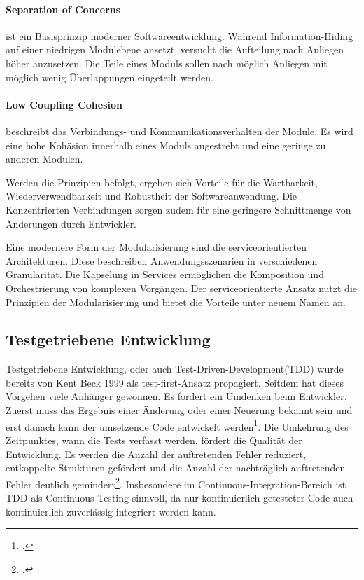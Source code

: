 \paragraph{Separation of Concerns} ist ein Basisprinzip moderner Softwareentwicklung. Während Information-Hiding auf einer niedrigen Modulebene ansetzt, versucht die \glqq Aufteilung nach Anliegen\grqq{} höher anzusetzen. Die Teile eines Moduls sollen nach möglich Anliegen  mit möglich wenig Überlappungen eingeteilt werden.
\paragraph{Low Coupling Cohesion} beschreibt das Verbindungs- und Kommunikationsverhalten der Module. Es wird eine hohe Kohäsion innerhalb eines Moduls angestrebt und eine geringe zu anderen Modulen.

Werden die Prinzipien befolgt, ergeben sich Vorteile für die Wartbarkeit, Wiederverwendbarkeit und Robustheit der Softwareanwendung. Die Konzentrierten Verbindungen sorgen zudem für eine geringere Schnittmenge von Änderungen durch Entwickler.

Eine modernere Form der Modularisierung sind die \glqq serviceorientierten Architekturen\grqq{}. Diese beschreiben Anwendungsszenarien in verschiedenen Granularität. Die Kapselung in Services ermöglichen die Komposition und Orchestrierung von komplexen Vorgängen. Der serviceorientierte Ansatz nutzt die Prinzipien der Modularisierung und bietet die Vorteile unter neuem Namen an.

\subsection{Testgetriebene Entwicklung}
\label{test-driven-development}

Testgetriebene Entwicklung, oder auch Test-Driven-Development(TDD) wurde bereits von Kent Beck 1999 als \glqq test-first\grqq{}-Ansatz propagiert. Seitdem hat dieses Vorgehen viele Anhänger gewonnen. Es fordert ein Umdenken beim Entwickler. Zuerst muss das Ergebnis einer Änderung oder einer Neuerung bekannt sein und erst danach kann der umsetzende Code entwickelt werden\footcite[vgl.][Kap. Understanding TDD]{tdd-java}. Die Umkehrung des Zeitpunktes, wann die Tests verfasst werden, fördert die Qualität der Entwicklung. Es werden die Anzahl der auftretenden Fehler reduziert, entkoppelte Strukturen gefördert und die Anzahl der nachträglich auftretenden Fehler deutlich gemindert\footcite[vgl.][]{tdd-ci-effectivness}.
Insbesondere im Continuous-Integration-Bereich ist TDD als Continuous-Testing sinnvoll, da nur kontinuierlich getesteter Code auch kontinuierlich zuverlässig integriert werden kann.

